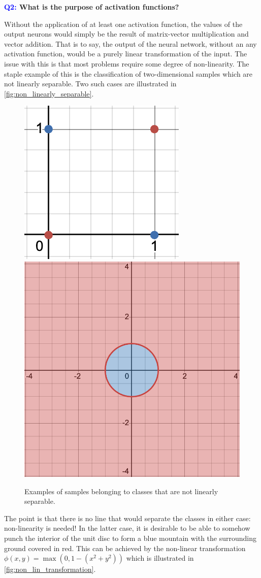 \documentclass[11pt]{article}
\begin{document}
\begin{center}
    \textbf{\textcolor{blue}{Q2:} What is the purpose of activation functions?}
\end{center}
Without the application of at least one activation function, the values of the output neurons would simply be the result of matrix-vector multiplication and vector addition. That is to say, the output of the neural network, without an any activation function, would be a purely linear transformation of the input. The issue with this is that most problems require some degree of non-linearity. The staple example of this is the classification of two-dimensional samples which are not linearly separable. Two such cases are illustrated in \autoref{fig:non_linearly_separable}.

\begin{figure}[ht]
    \centering
    \includegraphics[width=0.40\columnwidth]{./figures/neural_nets/NLA_xor.png}
    \hspace{20pt}
    \includegraphics[width=0.40\columnwidth]{./figures/neural_nets/NLA_circle.png}
    \caption{Examples of samples belonging to classes that are not linearly separable.}
    \label{fig:non_linearly_separable}
\end{figure}

The point is that there is no line that would separate the classes in either case: non-linearity is needed! In the latter case, it is desirable to be able to somehow punch the interior of the unit disc to form a blue mountain with the surrounding ground covered in red. This can be achieved by the non-linear transformation $\phi(x,y)=\max(0,1-(x^2+y^2))$ which is illustrated in \autoref{fig:non_lin_transformation}.
\end{document}
